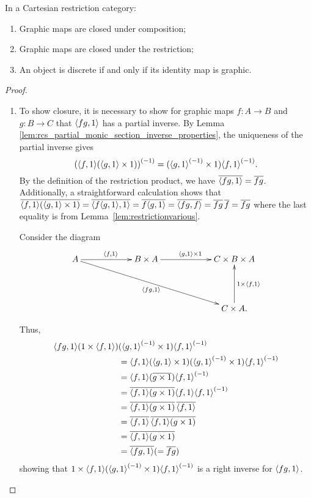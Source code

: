 \begin{lemma}\label{lem:graphic_maps_are_closed_in_a_cartesian_restriction_category}
  In a Cartesian restriction category:
  \begin{enumerate}[{(}i{)}]
    \item Graphic maps are closed under composition;
    \item Graphic maps are closed under the restriction;
    \item An object is discrete if and only if its identity map is graphic.
  \end{enumerate}
\end{lemma}
\begin{proof}
  \prepprooflist
  \begin{enumerate}[{(}i{)}]
    \item To show closure, it is necessary to show for graphic maps $f:A\to B$ and $g:B\to C$ that
      $\langle f g,1\rangle$ has a partial inverse. By Lemma
      \ref{lem:rcs_partial_monic_section_inverse_properties}, the uniqueness of the  partial inverse gives
      \[
        {(\langle f,1\rangle ( \langle g,1\rangle\times 1))}^{(-1)} = ({\langle g,1\rangle}^{(-1)} \times 1) {\langle f,1\rangle}^{(-1)} .
      \]
      By the definition of the restriction product, we have $\overline{\langle f g,1\rangle} = \overline{f g}$. Additionally,
      a straightforward calculation shows that
        $\overline{\langle f,1\rangle(\langle g,1\rangle \times 1)} =
          \overline{\langle f\langle g,1\rangle, 1\rangle} = \overline{f \langle g,1\rangle}
          = \overline{\langle f g, f\rangle} = \overline{f g}\,\overline{f} = \overline{f g}
        $
      where the last equality is from Lemma~\ref{lem:restrictionvarious}.

    Consider the diagram
    \[
      \xymatrix @C+35pt @R+20pt{
        A \ar[r]^{\<f,1\>} \ar[drr]_{\<f g,1\>} &
           B \times A  \ar[r]^{\<g,1\> \times 1}
           &  C \times B \times A \\
        &&C \times A. \ar[u]_{1 \times \<f,1\>}
      }
    \]

    Thus,
    \begin{align*}
      \langle f g,1\rangle  (1\times \langle f,1\rangle) &( {\langle g,1\rangle}^{(-1)}\times 1) {\langle f,1\rangle}^{(-1)}\\
      &=\langle f,1\rangle(\langle g,1\rangle\times 1 ) ({\langle g,1\rangle}^{(-1)}\times 1) {\langle f,1\rangle}^{(-1)}\\
      &=\langle f,1\rangle (\overline{g\times 1}) {\langle f,1\rangle}^{(-1)}\\
      &=\overline{\langle f,1\rangle (g\times 1)}  \langle f,1\rangle {\langle f,1\rangle}^{(-1)}\\
      &=\overline{\langle f,1\rangle (g\times 1)}\,  \overline{\langle f,1\rangle}\\
      &= \overline{\langle f,1\rangle}\, \overline{\langle f,1\rangle(g\times 1)}\\
      &= \overline{\langle f,1\rangle (g\times 1)}\\
      &= \overline{\langle f g,1\rangle}(=\overline{f g})\\
    \end{align*}
    showing that $1\times \langle f,1\rangle  ({\langle g,1\rangle}^{(-1)}\times 1 ) {\langle f,1\rangle}^{(-1)}$ is
    a right inverse for $\langle f g,1\rangle$.


\end{enumerate}
\end{proof}
